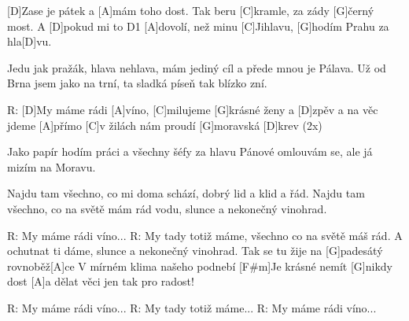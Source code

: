 
[D]Zase je pátek a [A]mám toho dost.
Tak beru [C]kramle, za zády [G]\null černý most.
A [D]pokud mi to D1 [A]dovolí,
než minu [C]Jihlavu, [G]hodím Prahu za hla[D]vu.

Jedu jak pražák, hlava nehlava,
mám jediný cíl a přede mnou je Pálava.
Už od Brna jsem jako na trní,
ta sladká píseň tak blízko zní.

R:
[D]My máme rádi [A]víno,
[C]milujeme [G]krásné ženy a [D]zpěv
a na věc jdeme [A]přímo
[C]v žilách nám proudí [G]moravská [D]krev (2x)

Jako papír hodím práci a všechny šéfy za hlavu
Pánové omlouvám se, ale já mizím na Moravu.

Najdu tam všechno, co mi doma schází, dobrý lid a klid a řád.
Najdu tam všechno, co na světě mám rád vodu, slunce a nekonečný vinohrad.

R: My máme rádi víno...
R: My tady totiž máme,
všechno co na světě máš rád.
A ochutnat ti dáme,
slunce a nekonečný vinohrad.
\slpc
Tak se tu žije na [G]padesátý rovnoběž[A]ce
V mírném klima našeho podnebí
[F#m]Je krásné nemít [G]nikdy dost
[A]a dělat věci jen tak pro radost!

R: My máme rádi víno...
R: My tady totiž máme...
R: My máme rádi víno...